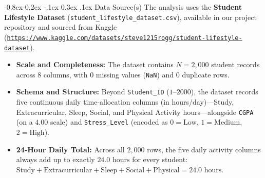 \documentclass[11pt,a4paper]{article}
\makeatletter
\renewcommand\subsection{\@startsection{subsection}{2}{\z@}%
                                     {-0.8ex\@plus -0.2ex \@minus -.1ex}%
                                     {0.3ex \@plus .1ex}%
                                     {\normalfont\normalsize\bfseries\color{accent}}}
\makeatother
\begin{document}
\subsection{Data Source(s)}
The analysis uses the \textbf{Student Lifestyle Dataset} (\texttt{student\_lifestyle\_dataset.csv}), available in our project repository and sourced from Kaggle (\href{https://www.kaggle.com/datasets/steve1215rogg/student-lifestyle-dataset}{\nolinkurl{https://www.kaggle.com/datasets/steve1215rogg/student-lifestyle-dataset}}).
\begin{itemize}\setlength{\itemsep}{0pt}\setlength{\parskip}{0pt}\setlength{\topsep}{1pt}
    \item \textbf{Scale and Completeness:} The dataset contains $N = 2,000$ student records across $8$ columns, with $0$ missing values (\texttt{NaN}) and $0$ duplicate rows.
    \item \textbf{Schema and Structure:} Beyond \texttt{Student\_ID} ($1\text{--}2000$), the dataset records five continuous daily time-allocation columns (in hours/day)---Study, Extracurricular, Sleep, Social, and Physical Activity hours---alongside \texttt{CGPA} (on a $4.00$ scale) and \texttt{Stress\_Level} (encoded as $0 = \text{Low}$, $1 = \text{Medium}$, $2 = \text{High}$).
    \item \textbf{24-Hour Daily Total:} Across all $2,000$ rows, the five daily activity columns always add up to exactly $24.0\text{ hours}$ for every student: $\text{Study} + \text{Extracurricular} + \text{Sleep} + \text{Social} + \text{Physical} = 24.0\text{ hours}$.
\end{itemize}
\end{document}
